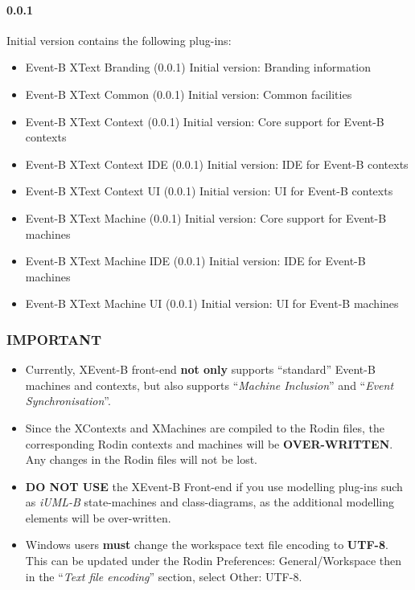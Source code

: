 \paragraph{0.0.1} Initial version contains the following plug-ins:
\begin{itemize}
\item Event-B XText Branding (0.0.1) Initial version: Branding information

\item Event-B XText Common (0.0.1) Initial version: Common facilities

\item Event-B XText Context (0.0.1) Initial version: Core support for Event-B contexts

\item Event-B XText Context IDE (0.0.1) Initial version: IDE for Event-B contexts

\item Event-B XText Context UI (0.0.1) Initial version: UI for Event-B contexts

\item Event-B XText Machine (0.0.1) Initial version: Core support for Event-B machines

\item Event-B XText Machine IDE (0.0.1) Initial version: IDE for Event-B machines

\item Event-B XText Machine UI (0.0.1) Initial version: UI for Event-B machines
\end{itemize}

\subsubsection{IMPORTANT}
\label{sec:important}

\begin{itemize}
\item Currently, XEvent-B front-end \textbf{not only} supports ``standard'' Event-B machines and contexts, but also supports ``\emph{Machine Inclusion}'' and ``\emph{Event Synchronisation}''.
\item Since the XContexts and XMachines are compiled to the Rodin files, the corresponding Rodin contexts and machines will be \textbf{OVER-WRITTEN}. Any changes in the Rodin files will not be lost.

\item \textbf{DO NOT USE} the XEvent-B Front-end if you use modelling plug-ins such as \emph{iUML-B} state-machines and class-diagrams, as the additional modelling elements will be over-written.

\item Windows users \textbf{must} change the workspace text file encoding to \textbf{UTF-8}. This can be updated under the Rodin Preferences: General/Workspace then in the ``\emph{Text file encoding}'' section, select Other: UTF-8.

\end{itemize}

